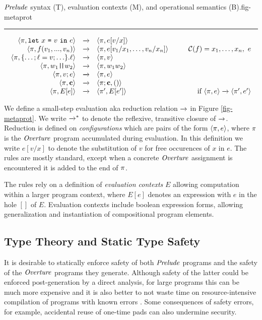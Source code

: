 \begin{fpfig}[t]{$\mathit{Prelude}$ syntax (T), evaluation contexts (M), and operational semantics (B).}{fig-metaprot}
{    \rule{130mm}{0.5pt}
    
    $$
    \begin{array}{rcl@{\hspace{10mm}}r}
      \config{\prog}{\elet{x}{v}{e}} &\redx& \config{\prog}{e[v/x]}\\
      \config{\prog}{f(v_1,...,v_n)} &\redx&
      \config{\prog}{e[v_1/x_1,\ldots,v_n/x_n]} & 
      \codebase(f) = x_1,\ldots,x_n,\ e\\
      \config{\prog}{\{\ldots; \flab = v; \ldots\}.\flab} &\redx&
      \config{\prog}{v}\\
      \config{\prog}{w_1\concat w_2} &\redx& \config{\prog}{w_1w_2}\\
      \config{\prog}{v;e} &\redx& \config{\prog}{e}\\
      \config{\prog}{\instr} &\redx& \config{\prog;\instr}{()}\\
      \config{\prog}{E[e]} &\redx& \config{\prog'}{E[e']} & \text{if}\ \config{\prog}{e} \redx \config{\prog'}{e'} 
    \end{array}
    $$
  }
\end{fpfig}

We define a small-step evaluation aka reduction relation $\xrightarrow{}$ in
Figure \ref{fig-metaprot}.  We write $\xrightarrow{}^{*}$ to denote the
reflexive, transitive closure of $\xrightarrow{}$. Reduction is defined on
\emph{configurations} which are pairs of the form $\langle \pi,e \rangle$,
where $\pi$ is the $\mathit{Overture}$ program accumulated during evaluation.
In this definition we write $e[v/x]$ to denote the substitution of $v$
for free occurences of $x$ in $e$. The rules are mostly standard,
except when a concrete $\mathit{Overture}$ assignment is encountered it is added
to the end of $\pi$.

The rules rely on a definition of \emph{evaluation contexts} $E$
allowing computation within a larger program context, where $E[e]$
denotes an expression with $e$ in the hole $[]$ of $E$. Evaluation
contexts include boolean expression forms, allowing generalization
and instantiation of compositional program elements.

\subsection{Type Theory and Static Type Safety}

It is desirable to statically enforce safety of both $\mathit{Prelude}$
programs and the safety of the $\mathit{Overture}$ programs they
generate. Although safety of the latter could be enforced
post-generation by a direct analysis, for large programs this can be
much more expensive and it is also better to not waste time on
resource-intensive compilation of programs with known errors
\cite{kreuter2012billion}. Some consequences of safety errors, for example, accidental
reuse of one-time pads can also undermine security.

